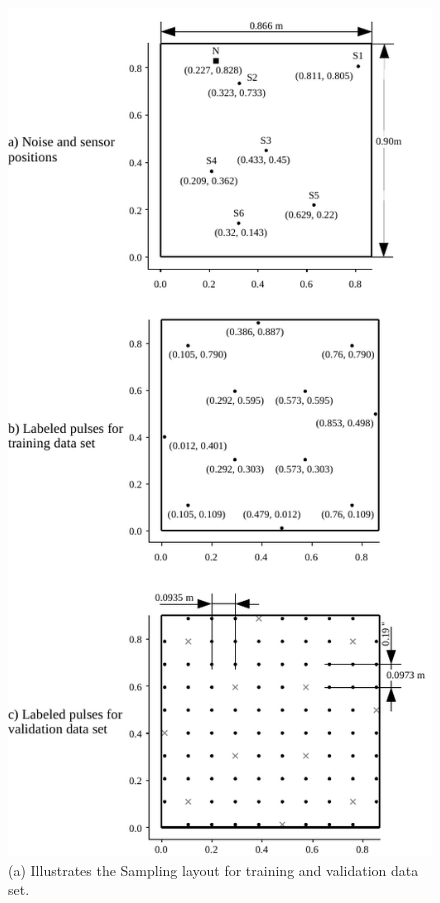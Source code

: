 \begin{figure}[t!]
	\centering
	\includegraphics[width=\columnwidth]{../figures/histograms/data_set.pdf}
	\caption{(a) Illustrates the Sampling layout for training and validation data set.}
	\label{fig:data_set}
\end{figure}

